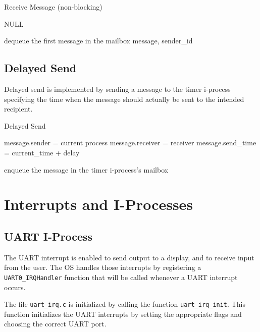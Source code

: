 \documentclass[12pt]{report}
\begin{document}
\begin{algorithm}[H]
	\caption{Receive Message (non-blocking)}
	\begin{algorithmic}[1]
				\State\Return NULL
			\EndIf

			\State dequeue the first message in the mailbox
			\State\Return message, sender_id
		\EndFunction
	\end{algorithmic}
\end{algorithm}


\subsection{Delayed Send}

Delayed send is implemented by sending a message to the timer i-process specifying the time when the message should actually be sent to the intended recipient.

\begin{algorithm}[H]
	\caption{Delayed Send}
	\begin{algorithmic}[1]
			\State message.sender = current process
			\State message.receiver = receiver
			\State message.send_time = current_time + delay

			\State enqueue the message in the timer i-process's mailbox 
		\EndFunction
	\end{algorithmic}
\end{algorithm}


\section{Interrupts and I-Processes}

\subsection{UART I-Process}

The UART interrupt is enabled to send output to a display, and to receive input from the user. The OS handles those interrupts by registering a \texttt{UART0_IRQHandler} function that will be called whenever a UART interrupt occurs.

The file \texttt{uart_irq.c} is initialized by calling the function \texttt{uart_irq_init}. This function initializes the UART interrupts by setting the appropriate flags and choosing the correct UART port.
\end{document}
